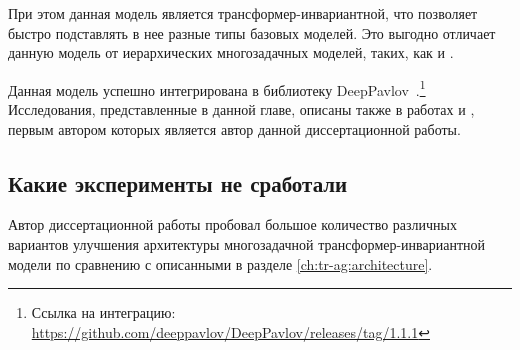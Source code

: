 При этом данная модель является трансформер-инвариантной, что позволяет быстро подставлять в нее разные типы базовых моделей. Это выгодно отличает данную модель от иерархических многозадачных моделей, таких, как \cite{stickland_2019} и \cite{TaskEmbedded2021}.

Данная модель успешно интегрирована в библиотеку DeepPavlov~\cite{dp_2023}.\footnote{Ссылка на интеграцию: \url{https://github.com/deeppavlov/DeepPavlov/releases/tag/1.1.1}} Исследования, представленные в данной главе, описаны также в работах \cite{rumtl} и \cite{enmtl}, первым автором которых является автор данной диссертационной работы.

\subsection{Какие эксперименты не сработали}\label{ch:tr-ag:failed_attempts} 
Автор диссертационной работы пробовал большое количество различных вариантов улучшения архитектуры многозадачной трансформер-инвариантной модели по сравнению с описанными в разделе \ref{ch:tr-ag:architecture}.
